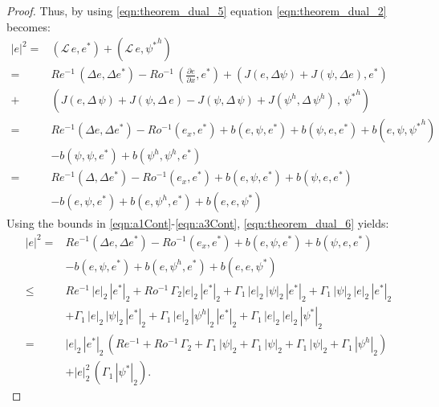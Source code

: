\begin{proof}
  Thus, by using \eqref{eqn:theorem_dual_5} equation \eqref{eqn:theorem_dual_2}
  becomes:
  \begin{align}
    |e|^2 =& (\mathcal{L} \, e , e^*) + (\mathcal{L} \, e , {\psi^*}^h) \nonumber \\
    =& Re^{-1} \, (\Delta e , \Delta e^*)
      - Ro^{-1} \, \left( \frac{\partial e}{\partial x} , e^* \right)
      + \left( J(e , \Delta \psi) + J(\psi , \Delta e) , e^* \right) \nonumber \\
    +& \left( J(e , \Delta \, \psi) + J(\psi , \Delta \, e)
      - J(\psi , \Delta \, \psi) + J(\psi^h , \Delta \, \psi^h)
      \, , \, {\psi^*}^h \right) \nonumber \\
    =& Re^{-1} (\Delta e ,\Delta e^*) - Ro^{-1}(e_x , e^*)
      + b(e , \psi , e^*) + b(\psi , e, e^*) + b(e , \psi , {\psi^*}^h) \nonumber \\
    & - b(\psi , \psi , e^*) + b(\psi^h , \psi^h , e^*) \nonumber \\
    =& Re^{-1} (\Delta , \Delta e^*) - Ro^{-1}(e_x , e^*)
      + b(e , \psi , e^*) + b(\psi , e, e^*) \nonumber \\
    & - b(e , \psi , e^*) + b(e , \psi^h , e^*) + b(e , e , \psi^*)
    \label{eqn:theorem_dual_6}
  \end{align}
  Using the bounds in \eqref{eqn:a1Cont}-\eqref{eqn:a3Cont},
  \eqref{eqn:theorem_dual_6} yields:
  \begin{align}
    |e|^2 =& Re^{-1} (\Delta e ,\Delta e^*) - Ro^{-1} (e_x , e^*)
      + b(e , \psi , e^*) + b(\psi , e, e^*) \nonumber \\
    & - b(e , \psi , e^*) + b(e , \psi^h , e^*) + b(e , e , \psi^*) \nonumber \\
    \leq& Re^{-1} \, | e |_2 \, |e^* |_2 + Ro^{-1} \, \Gamma_2 | e |_2 \, |e^* |_2
      + \Gamma_1 \, | e |_2 \, | \psi |_2 \, | e^* |_2
      + \Gamma_1 \, | \psi |_2 \, | e |_2 \, | e^* |_2 \nonumber \\
    & + \Gamma_1 \, | e |_2 \, | \psi |_2 \, | e^* |_2
      + \Gamma_1 \, | e |_2 \, | \psi^h |_2 \, | e^* |_2
      + \Gamma_1 \, | e |_2 \, | e |_2 \, | \psi^* |_2 \nonumber \\
    =& | e |_2 \, |e^* |_2 \, \left( Re^{-1} + Ro^{-1}\, \Gamma_2 + \Gamma_1 \, | \psi |_2
      + \Gamma_1 \, | \psi |_2
      + \Gamma_1 \, | \psi |_2
      + \Gamma_1 \, | \psi^h |_2 \right) \nonumber \\
    & + | e |_2^2 \, \left( \Gamma_1 \, | \psi^* |_2 \right) .
    \label{eqn:theorem_dual_7}
  \end{align}

\end{proof}
